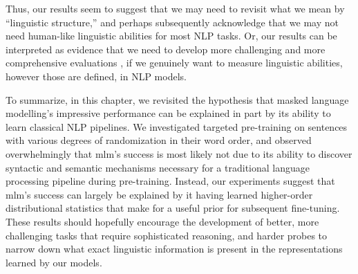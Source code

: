 \documentclass[letterpaper, 12pt]{report}
\begin{document}
Thus, our results seem to suggest that we may need to revisit what we mean by ``linguistic structure,'' and perhaps subsequently acknowledge that we may not need human-like linguistic abilities for most NLP tasks. Or, our results can be interpreted as evidence that we need to develop more challenging and more comprehensive evaluations%
, if we genuinely want to measure linguistic abilities, however those are defined, in NLP models.


To summarize, in this chapter, we revisited the hypothesis that masked language modelling's impressive performance can be explained in part by its ability to learn classical NLP pipelines. We investigated targeted pre-training on sentences with various degrees of randomization in their word order, and observed overwhelmingly that \acrshort{mlm}'s success is most likely not due to its ability to discover syntactic and semantic mechanisms necessary for a traditional language processing pipeline during pre-training. Instead, our experiments suggest that \acrshort{mlm}'s success can largely be explained by it having learned higher-order distributional statistics that make for a useful prior for subsequent fine-tuning. These results should hopefully encourage the development of better, more challenging tasks that require sophisticated reasoning, and harder probes to narrow down what exact linguistic information is present in the representations learned by our models.
%


\end{document}
